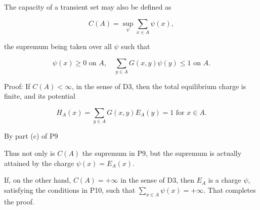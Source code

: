 The capacity of a transient set may also be defined as

$$C(A) = \sup_{\psi} \sum_{x \in A} \psi(x),$$

the supremum being taken over all $\psi$ such that

$$\psi(x) \geq 0 \text{ on } A, \quad \sum_{y \in A} G(x,y)\psi(y) \leq 1 \text{ on } A.$$

Proof: If $C(A) < \infty$, in the sense of D3, then the total equilibrium charge is finite, and its potential

$$H_A(x) = \sum_{y \in A} G(x,y)E_A(y) = 1 \text{ for } x \in A.$$

By part (c) of P9

Thus not only is $C(A)$ the supremum in P9, but the supremum is actually attained by the charge $\psi(x) = E_A(x)$.

If, on the other hand, $C(A) = +\infty$ in the sense of D3, then $E_A$ is a charge $\psi$, satisfying the conditions in P10, such that $\sum_{x \in A} \psi(x) = +\infty$. That completes the proof.